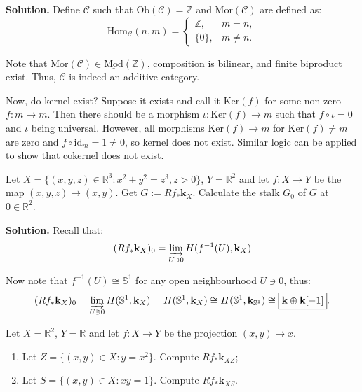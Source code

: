 \documentclass{category-template}
\begin{document}
\textbf{Solution.} Define $\mathcal{C}$ such that $\text{Ob}(\mathcal{C}) =
\mathbb{Z}$ and $\text{Mor}(\mathcal{C})$ are defined as:
\begin{equation*}
    \text{Hom}_{\mathcal{C}}(n, m) = \begin{cases}
        \mathbb{Z}, & m=n, \\
        \{0\}, & m \neq n.
    \end{cases}
\end{equation*}

Note that $\text{Mor}(\mathcal{C}) \in \underline{\text{Mod}}(\mathbb{Z})$,
composition is bilinear, and finite biproduct exist. Thus, $\mathcal{C}$ is 
indeed an additive category. 

Now, do kernel exist? Suppose it exists and call it $\text{Ker}(f)$ for some
non-zero $f: m \to m$. Then there should be a morphism $\iota: \text{Ker}(f) \to
m$ such that $f \circ \iota = 0$ and $\iota$ being universal. However, all
morphisms $\text{Ker}(f) \to m$ for $\text{Ker}(f) \neq m$ are zero and $f \circ
\text{id}_m = 1 \neq 0$, so kernel does not exist. Similar logic can be applied
to show that cokernel does not exist.

\begin{problem}
    Let $X=\{(x,y,z) \in \mathbb{R}^3: x^2+y^2=z^3,z>0\}$, $Y=\mathbb{R}^2$ and
    let $f: X \to Y$ be the map $(x,y,z) \mapsto (x,y)$. Get $G :=
    Rf_*\mathbf{k}_X$. Calculate the stalk $G_0$ of $G$ at $0 \in \mathbb{R}^2$.
\end{problem}

\textbf{Solution.} Recall that:
\begin{equation*}
    (Rf_*\mathbf{k}_X)_0 = \varinjlim_{U \ni 0}H(f^{-1}(U), \mathbf{k}_X)
\end{equation*}

Now note that $f^{-1}(U) \cong \mathbb{S}^1$ for any open neighbourhood 
$U \ni 0$, thus:
\begin{equation*}
    (Rf_*\mathbf{k}_X)_0 = \varinjlim_{U \ni 0}H(\mathbb{S}^1, \mathbf{k}_X) = H(\mathbb{S}^1, \mathbf{k}_X) \cong H(\mathbb{S}^1, \mathbf{k}_{\mathbb{S}^1}) \cong \boxed{\mathbf{k} \oplus \mathbf{k}[-1]}.
\end{equation*}

\begin{problem}
    Let $X=\mathbb{R}^2$, $Y=\mathbb{R}$ and let $f: X \to Y$ be the projection 
    $(x,y) \mapsto x$.
    \begin{enumerate}
        \item[(a)] Let $Z = \{(x,y) \in X: y = x^2\}$. Compute $Rf_*\mathbf{k}_{XZ}$;
        \item[(b)] Let $S = \{(x,y) \in X: xy = 1\}$. Compute $Rf_*\mathbf{k}_{XS}$. 
    \end{enumerate}
\end{problem}
\end{document}
